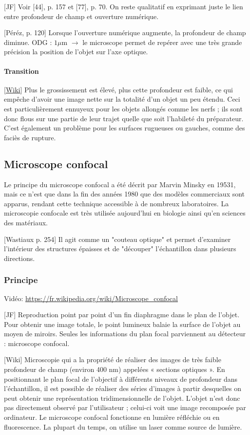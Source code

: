 \documentclass[11pt]{report}
\numberwithin{figure}{section}
\numberwithin{equation}{section}
\numberwithin{table}{section}
\newcommand{\1}{\boldsymbol{1}}
\begin{document}
[JF] Voir [44], p. 157 et [77], p. 70. On reste qualitatif en exprimant juste le lien entre profondeur de champ et ouverture
numérique.

[Péréz, p. 120] Lorsque l'ouverture numérique augmente, la profondeur de champ diminue. ODG : $1 \mu$m $\rightarrow$ le microscope permet de repérer avec une très grande précision la position de l'objet sur l'axe optique.


\paragraph{Transition} [\href{https://fr.wikipedia.org/wiki/Microscope_confocal}{Wiki}] Plus le grossissement est élevé, plus cette profondeur est faible, ce qui empêche d'avoir une image nette sur la totalité d'un objet un peu étendu. Ceci est particulièrement ennuyeux pour les objets allongés comme les nerfs ; ils sont donc flous sur une partie de leur trajet quelle que soit l'habileté du préparateur. C'est également un problème pour les surfaces rugueuses ou gauches, comme des faciès de rupture.
 
\subsection{Microscope confocal}

Le principe du microscope confocal a été décrit par Marvin Minsky en 19531, mais ce n’est que dans la fin des années 1980 que des modèles commerciaux sont apparus, rendant cette technique accessible à de nombreux laboratoires. La microscopie confocale est très utilisée aujourd'hui en biologie ainsi qu’en sciences des matériaux.

[Wastiaux p. 254] Il agit comme un "couteau optique" et permet d'examiner l’intérieur des structures épaisses et de "découper" l’échantillon dans plusieurs directions.


\subsubsection{Principe}

Vidéo: \url{https://fr.wikipedia.org/wiki/Microscope_confocal}

[JF] Reproduction point par point d’un fin diaphragme dans le plan de l’objet. Pour obtenir une image totale, le point lumineux balaie la surface de l’objet au moyen de miroirs. Seules les informations du plan focal parviennent au détecteur : microscope confocal.

[Wiki] Microscopie qui a la propriété de réaliser des images de très faible profondeur de champ (environ 400 nm) appelées « sections optiques ». En positionnant le plan focal de l’objectif à différents niveaux de profondeur dans l’échantillon, il est possible de réaliser des séries d’images à partir desquelles on peut obtenir une représentation tridimensionnelle de l’objet. L'objet n'est donc pas directement observé par l'utilisateur ; celui-ci voit une image recomposée par ordinateur. Le microscope confocal fonctionne en lumière réfléchie ou en fluorescence. La plupart du temps, on utilise un laser comme source de lumière.  
\end{document}
